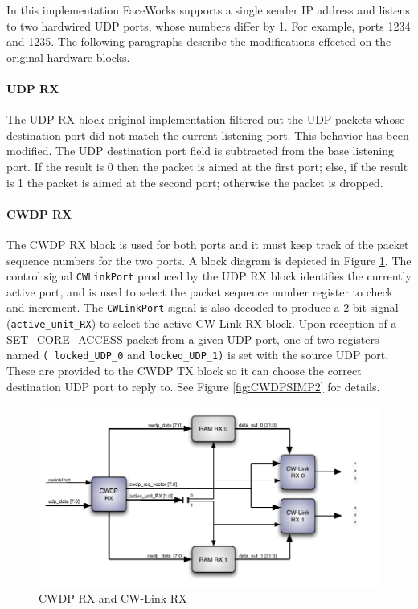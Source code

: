 \documentclass[defaultstyle,10pt,master,Helvetica]{thesis}
\begin{document}
In this implementation FaceWorks supports a single sender \ac{IP} address and listens to two hardwired \ac{UDP} ports, whose numbers differ by 1. For example, ports 1234 and 1235. The following paragraphs describe the modifications effected on the original hardware blocks.

\paragraph*{\ac{UDP} RX} The \ac{UDP} RX block original implementation filtered out the \ac{UDP} packets whose destination port did not match the current listening port. This behavior has been modified. The \ac{UDP} destination port field is subtracted from the base listening port. If the result is 0 then the packet is aimed at the first port; else, if the result is 1 the packet is aimed at the second port; otherwise the packet is dropped.

\paragraph*{CWDP RX} The \ac{CWDP} RX block is used for both ports and it must keep track of the packet sequence numbers for the two ports. A block diagram is depicted in Figure \ref{fig:CWDPRXDETAIL}. The control signal {\tt CWLinkPort} produced by the \ac{UDP} RX block identifies the currently active port, and is used to select the packet sequence number register to check and increment. The \texttt{CWLinkPort} signal is also decoded to produce a 2-bit signal (\texttt{active\_unit\_RX}) to select the active CW-Link RX block. Upon reception of a SET\_CORE\_ACCESS packet from a given \ac{UDP} port, one of two registers named {\tt( locked\_UDP\_0} and {\tt locked\_UDP\_1)} is set with the source \ac{UDP} port. These are provided to the \ac{CWDP} TX block so it can choose the correct destination \ac{UDP} port to reply to. See Figure \ref{fig:CWDPSIMP2} for details.


\begin{figure}[h]
  \centering
      \includegraphics[scale=1.2,center]{Diagrams/CWDP-RX-Detail.pdf}
  \caption{\ac{CWDP} RX and CW-Link RX}\label{fig:CWDPRXDETAIL}
\end{figure}
\end{document}
